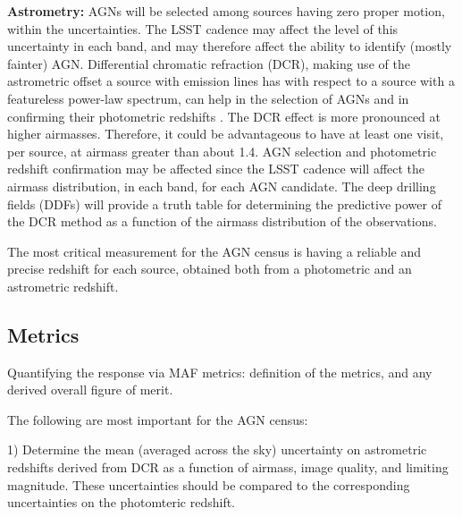 
{\bf Astrometry:} AGNs will be selected among sources having zero
proper motion, within the uncertainties. The LSST cadence may affect
the level of this uncertainty in each band, and may therefore affect
the ability to identify (mostly fainter) AGN.
%
Differential chromatic refraction (DCR), making use of the astrometric
offset a source with emission lines has with respect to a source with
a featureless power-law spectrum, can help in the selection of AGNs
and in confirming their photometric redshifts
\citep{KaczmarczikEtal2009}. The DCR effect is more pronounced at
higher airmasses. Therefore, it could be advantageous to have at least one
visit, per source, at airmass greater than about 1.4. AGN selection
and photometric redshift confirmation may be affected since the LSST
cadence will affect the airmass distribution, in each band, for each
AGN candidate.
%
The deep drilling fields (DDFs) will provide a truth table for determining
the predictive power of the DCR method as a function of the airmass
distribution of the observations.

The most critical measurement for the AGN census is having a reliable
and precise redshift for each source, obtained both from a photometric
and an astrometric redshift.




\subsection{Metrics}
\label{sec:\secname:metrics}

Quantifying the response via MAF metrics: definition of the metrics,
and any derived overall figure of merit.

The following are most important for the AGN census:

1) Determine the mean (averaged across the sky) uncertainty on astrometric
redshifts derived from DCR as a function of airmass, image quality, and
limiting magnitude. These uncertainties should be compared to the
corresponding uncertainties on the photomteric redshift.

